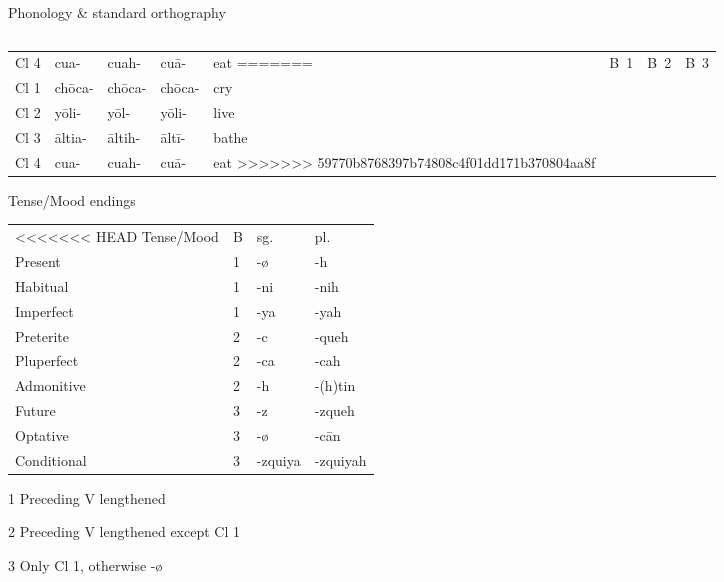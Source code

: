 \documentclass[12pt]{beamer}
\newcommand{\nah}[1]{\textcolor{nahgrn}{#1}}
\newcommand{\trs}[1]{\textcolor{nahblu}{#1}}
\begin{document}
\begin{frame}
\begin{columns}[t]
\begin{column}{.22\linewidth}
\begin{block}{Phonology \& standard orthography}
\begin{threeparttable}
\begin{tablenotes}
\begin{frame}
\begin{frame}
\begin{columns}[t]
\begin{column}{.18\linewidth}
\begin{example}
\begin{tabular}{lllll}
          Cl 4 & \nah{cua-}   & \nah{cuah-}  & \nah{cuā-}   & \trs{eat}  
=======
               & B~1          & B~2          & B~3          &             \\
          Cl 1 & \nah{chōca-} & \nah{chōca-} & \nah{chōca-} & \trs{cry}   \\
          Cl 2 & \nah{yōli-}  & \nah{yōl-}   & \nah{yōli-}  & \trs{live}  \\
          Cl 3 & \nah{āltia-} & \nah{āltih-} & \nah{āltī-}  & \trs{bathe} \\
          Cl 4 & \nah{cua-}   & \nah{cuah-}  & \nah{cuā-}   & \trs{eat}
>>>>>>> 59770b8768397b74808c4f01dd171b370804aa8f
        \end{tabular}
      \end{example}
      \begin{block}{Tense/Mood endings}
        \begin{threeparttable}
          \begin{tabular}{llll}
<<<<<<< HEAD
            Tense/Mood  & B & sg.             & pl.                        \\
            Present     & 1    & \nah{-ø}              & \nah{-h}               \\
            Habitual    & 1    & \nah{-ni}\tnote{1}   & \nah{-nih}\tnote{1}    \\
            Imperfect   & 1    & \nah{-ya}\tnote{2}   & \nah{-yah}             \\
            Preterite   & 2    & \nah{-c}\tnote{3}             & \nah{-queh}            \\
            Pluperfect  & 2    & \nah{-ca}            & \nah{-cah}             \\
            Admonitive  & 2    & \nah{-h}\tnote{3} & \nah{-(h)tin}\tnote{3} \\
            Future      & 3    & \nah{-z}             & \nah{-zqueh}           \\
            Optative    & 3    & \nah{-ø}              & \nah{-cān}             \\
            Conditional & 3    & \nah{-zquiya}        & \nah{-zquiyah}        
          \end{tabular}
          \begin{tablenotes}
          \item[1] Preceding V lengthened
          \item[2] Preceding V lengthened except Cl 1
          \item[3] Only Cl 1, otherwise \nah{-ø}

\end{tablenotes}
\end{threeparttable}
\end{block}
\end{column}
\end{columns}
\end{frame}
\end{frame}
\end{tablenotes}
\end{threeparttable}
\end{block}
\end{column}
\end{columns}
\end{frame}
\end{document}
